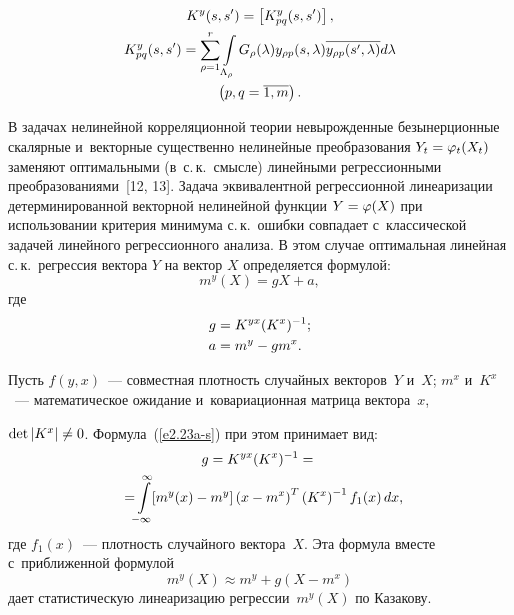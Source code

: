 \begin{multicols}{2}
\noindent
\begin{multline*}
     K^y (s,s') =\left[ K_{pq}^y (s,s')\right],\\
     K_{pq}^y (s,s') =\displaystyle \sum\limits_{\rho=1}^r \int\limits_{\Lambda_\rho} G_\rho (\lambda) 
y_{\rho p}(s,\lambda) \overline{y_{\rho p}(s',\lambda)}d\lambda\\ 
\left(p,q=\overline{1,m}\right).
\end{multline*}

В задачах нелинейной корреляционной теории невырожденные безынерционные 
скалярные и~векторные существенно нелинейные преобразования $Y_t \hm=\varphi_t(X_t)$ 
заменяют оптимальными (в~с.\,к.\ смыс\-ле) линейными регрессионными 
преобразованиями~[12, 13]. Задача эквивалентной регрессионной линеаризации 
детерминированной векторной нелинейной функции $Y\hm=\varphi (X)$ при использовании 
критерия минимума с.\,к.\ ошибки совпадает с~классической задачей 
линейного регрессионного анализа. В этом случае оптимальная линейная 
с.\,к.\ регрессия вектора $Y$ на вектор $X$ определяется формулой:
    \begin{equation}
    m^y(X) =gX+a,
    \label{e2.23-s}
    \end{equation}
    где
    \begin{align}
g&=K^{yx} (K^x)^{-1}; \label{e2.23a-s}\\
a&=m^y-gm^x.\notag
\end{align}
        


Пусть $f(y,x)$~--- совместная плотность случайных векторов~$Y$ и~$X$; $m^x$ и~$K^x$~--- математическое
 ожидание и~ковариационная матрица вектора~$x$,\linebreak\vspace*{-12pt}

\pagebreak

\noindent
$\mathrm{det}\,|K^x |\hm\ne 0$. Формула~(\ref{e2.23a-s}) при этом принимает вид:
    \begin{multline}
    g=K^{yx} (K^x)^{-1} ={}\\
    {}=\!\!\int\limits_{-\infty}^\infty \!\!\left[ m^y(x) - m^y\right] \left(x-m^x\right)^T \left(K^x\right)^{-1} f_1 (x) \, dx,
    \!\!\label{e2.24-s}
\end{multline}
где  $f_1(x)$~--- плотность случайного вектора~$X$. Эта формула вместе с~приближенной формулой
   \begin{equation*}
    m^y(X) \approx m^y +g(X-m^x)
    \end{equation*}
дает статистическую линеаризацию регрессии~$m^y(X)$ по Казакову.


\end{multicols}
